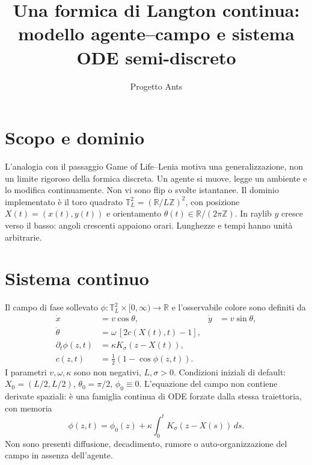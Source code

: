 \documentclass[11pt,a4paper]{article}
\title{Una formica di Langton continua:\\modello agente--campo e sistema ODE semi-discreto}
\author{Progetto Ants}
\date{}
\newcommand{\T}{\mathbb{T}}
\newcommand{\R}{\mathbb{R}}
\begin{document}
\maketitle

\section{Scopo e dominio}
L'analogia con il passaggio Game of Life--Lenia motiva una generalizzazione,
non un limite rigoroso della formica discreta. Un agente si muove, legge un
ambiente e lo modifica continuamente. Non vi sono flip o svolte istantanee.
Il dominio implementato è il toro quadrato
$\T_L^2=(\R/L\mathbb Z)^2$, con posizione $X(t)=(x(t),y(t))$ e orientamento
$\theta(t)\in\R/(2\pi\mathbb Z)$. In raylib $y$ cresce verso il basso:
angoli crescenti appaiono orari. Lunghezze e tempi hanno unità arbitrarie.

\section{Sistema continuo}
Il campo di fase sollevato $\phi:\T_L^2\times[0,\infty)\to\R$ e
l'osservabile colore sono definiti da
\begin{align}
 \dot x &= v\cos\theta,& \dot y&=v\sin\theta,\\
 \dot\theta &= \omega\,[2c(X(t),t)-1],\label{eq:turn}\\
 \partial_t\phi(z,t)&=\kappa K_\sigma(z-X(t)),\label{eq:phase}\\
 c(z,t)&=\tfrac12(1-\cos\phi(z,t)).\label{eq:color}
\end{align}
I parametri $v,\omega,\kappa$ sono non negativi, $L,\sigma>0$.
Condizioni iniziali di default: $X_0=(L/2,L/2)$, $\theta_0=\pi/2$,
$\phi_0\equiv0$. L'equazione del campo non contiene derivate spaziali:
è una famiglia continua di ODE forzate dalla stessa traiettoria, con memoria
\begin{equation}
 \phi(z,t)=\phi_0(z)+\kappa\int_0^t K_\sigma(z-X(s))\,ds.
\end{equation}
Non sono presenti diffusione, decadimento, rumore o auto-organizzazione
del campo in assenza dell'agente.
\end{document}
